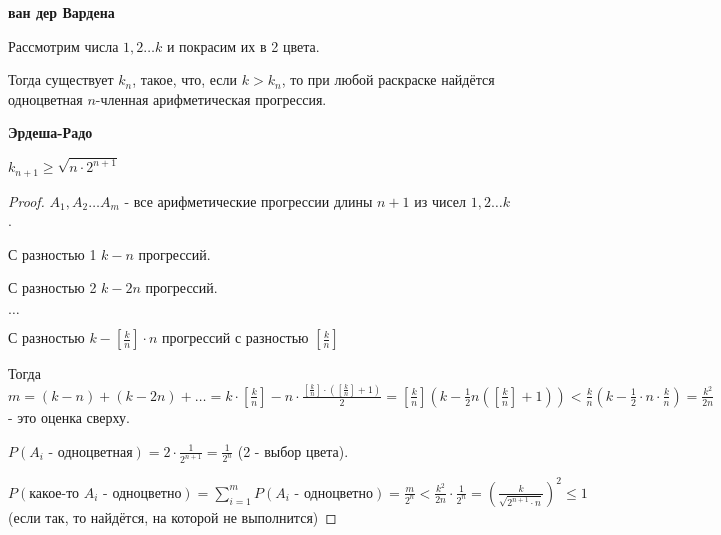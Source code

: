 \begin{theorem}
    \textbf{ван дер Вардена}

    Рассмотрим числа $1, 2 \ldots k$ и покрасим их в 2 цвета. 

    Тогда существует $k_n$, такое, что, если $k > k_n$, то при любой раскраске
    найдётся одноцветная $n$-членная арифметическая прогрессия.
\end{theorem}

\begin{theorem}
    \textbf{Эрдеша-Радо}

    $k_{n + 1} \geqslant \sqrt{n \cdot 2^{n + 1}}$
\end{theorem}

\begin{proof}
    $A_1, A_2 \ldots A_m$ - все арифметические прогрессии длины $n + 1$ из чисел
    $1, 2 \ldots k$. 

    С разностью 1 $k - n$ прогрессий.

    С разностью 2 $k - 2n$ прогрессий.

    $\ldots$

    С разностью $k - [\frac{k}{n}] \cdot n$ прогрессий с разностью $[\frac{k}{n}]$

    Тогда $m = (k - n) + (k - 2n) + \ldots = k \cdot [\frac{k}{n}] - n \cdot \frac{[\frac{k}{n}] \cdot ([\frac{k}{n}] + 1)}{2} = 
    [\frac{k}{n}] (k - \frac{1}{2}n ([\frac{k}{n}] + 1)) < \frac{k}{n} (k - \frac{1}{2} \cdot n \cdot \frac{k}{n}) = \frac{k^2}{2n}$ - это
    оценка сверху.

    $P(\text{$A_i$ - одноцветная}) = 2 \cdot \frac{1}{2^{n + 1}} = \frac{1}{2^n}$ (2 - выбор цвета).

    $P(\text{какое-то $A_i$ - одноцветно}) = \sum_{i = 1}^m P(\text{$A_i$ - одноцветно}) = \frac{m}{2^n} < 
    \frac{k^2}{2n} \cdot \frac{1}{2^n} = (\frac{k}{\sqrt{2^{n + 1} \cdot n}})^2 \leqslant 1$
    (если так, то найдётся, на которой не выполнится)
\end{proof}









